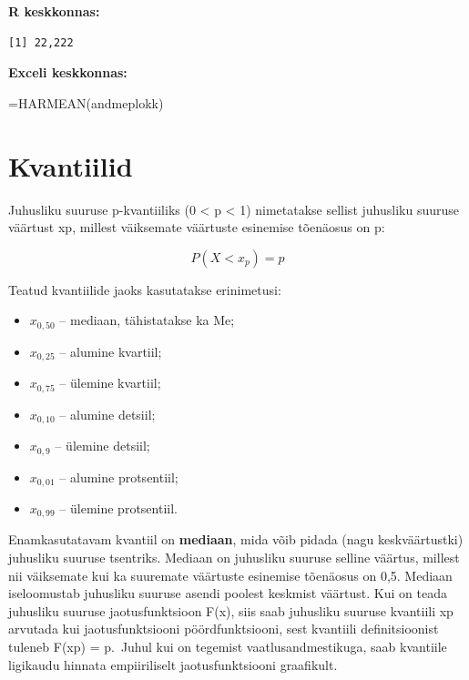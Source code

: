 \documentclass[
]{book}
\newenvironment{Shaded}{\begin{snugshade}}{\end{snugshade}}
\newcommand{\CommentTok}[1]{\textcolor[rgb]{0.56,0.35,0.01}{\textit{#1}}}
\newcommand{\DecValTok}[1]{\textcolor[rgb]{0.00,0.00,0.81}{#1}}
\newcommand{\FunctionTok}[1]{\textcolor[rgb]{0.13,0.29,0.53}{\textbf{#1}}}
\newcommand{\NormalTok}[1]{#1}
\newcommand{\SpecialCharTok}[1]{\textcolor[rgb]{0.81,0.36,0.00}{\textbf{#1}}}
\providecommand{\tightlist}{%
  \setlength{\itemsep}{0pt}\setlength{\parskip}{0pt}}
\renewenvironment{Shaded} {\begin{snugshade}\footnotesize} {\end{snugshade}}
\begin{document}
\textbf{R keskkonnas:}

\begin{Shaded}
\end{Shaded}

\begin{verbatim}
[1] 22,222
\end{verbatim}

\textbf{Exceli keskkonnas:}

\begin{naideExcel}
=HARMEAN(andmeplokk)

\end{naideExcel}

\section{Kvantiilid}\label{kvantiilid}

Juhusliku suuruse p-kvantiiliks (0 \textless{} p \textless{} 1) nimetatakse sellist juhusliku suuruse väärtust xp, millest väiksemate väärtuste esinemise tõenäosus on p:

\[ P (X < x_p) = p \]

Teatud kvantiilide jaoks kasutatakse erinimetusi:

\begin{itemize}
\tightlist
\item
  \(x_{0,50}\) -- mediaan, tähistatakse ka Me;
\item
  \(x_{0,25}\) -- alumine kvartiil;
\item
  \(x_{0,75}\) -- ülemine kvartiil;
\item
  \(x_{0,10}\) -- alumine detsiil;
\item
  \(x_{0,9}\) -- ülemine detsiil;
\item
  \(x_{0,01}\) -- alumine protsentiil;
\item
  \(x_{0,99}\) -- ülemine protsentiil.
\end{itemize}

Enamkasutatavam kvantiil on \textbf{mediaan}, mida võib pidada (nagu keskväärtustki) juhusliku suuruse tsentriks. Mediaan on juhusliku suuruse selline väärtus, millest nii väiksemate kui ka suuremate väärtuste esinemise tõenäosus on 0,5. Mediaan iseloomustab juhusliku suuruse asendi poolest keskmist väärtust.
Kui on teada juhusliku suuruse jaotusfunktsioon F(x), siis saab juhusliku suuruse kvantiili xp arvutada kui jaotusfunktsiooni pöördfunktsiooni, sest kvantiili definitsioonist tuleneb F(xp) = p.~Juhul kui on tegemist vaatlusandmestikuga, saab kvantiile ligikaudu hinnata empiiriliselt jaotusfunktsiooni graafikult.
\end{document}
